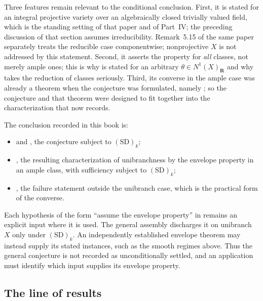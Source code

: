Three features remain relevant to the conditional conclusion.
First, it is stated for an integral projective variety over an algebraically
closed trivially valued field, which is the standing setting of that paper
and of Part~IV; the preceding discussion of that section assumes irreducibility.
Remark~5.15 of the same paper separately treats the reducible case
componentwise; nonprojective $X$ is not addressed by this statement.  Second, it asserts the property for \emph{all} classes,
not merely ample ones; this is why  is stated
for an arbitrary $\theta\in N^1(X)_{\mathbf R}$ and why
 takes the reduction of classes seriously.
Third, its converse in the ample case was already a theorem when the
conjecture was formulated, namely \cite[Theorem~5.12]{BJ22}; so the
conjecture and that theorem were designed to fit together into the
characterization that  now
records.

The conclusion recorded in this book is:

\begin{itemize}
\item {} and , the
      conjecture subject to $\mathrm{(SD)}_k$;
\item {}, the resulting
      characterization of unibranchness by the envelope property in an
      ample class, with sufficiency subject to $\mathrm{(SD)}_k$;
\item {}, the failure statement outside
      the unibranch case, which is the practical form of the converse.
\end{itemize}

Each hypothesis of the form ``assume the envelope property'' in
 remains an explicit input
where it is used. The general assembly discharges it on unibranch $X$
only under $\mathrm{(SD)}_k$. An independently established envelope
theorem may instead supply its stated instances, such as the smooth
regimes above. Thus the general conjecture is not recorded as
unconditionally settled, and an application must identify which input
supplies its envelope property.

\subsection{The line of results}
\label{sec:ch45-line-of-results}

